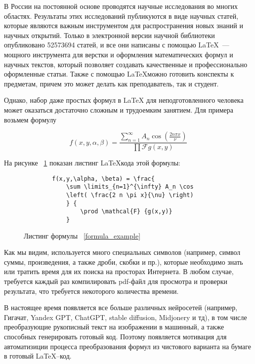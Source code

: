 \introduction %

В России на постоянной основе проводятся научные исследования во многих областях. Результаты этих исследований публикуются в виде научных статей, которые являются важным инструментом для распространения новых знаний и научных открытий.
Только в электронной версии научной библиотеки опубликовано 52573694 \cite{eLib} статей, и все они написаны с помощью \LaTeX ~--- мощного инструмента для верстки и оформления математических формул и научных текстов, который позволяет создавать качественные и профессионально оформленные статьи. 
Также с помощью \LaTeX \quad можно готовить конспекты к предметам, причем это может делать как преподаватель, так и студент.

Однако, набор даже простых формул в LaTeX для неподготовленного человека может оказаться достаточно сложным и трудоемким занятием.
Для примера возьмем формулу

\begin{equation}
    \label{formula_example}
        f(x,y,\alpha, \beta) = \frac{\sum \limits_{n=1}^{\infty} 
        A_n \cos \left( \frac{2 n \pi x}{\nu} \right)} {\prod \mathcal{F} {g(x,y)} } 
\end{equation}

На рисунке ~\ref{formula_listing} показан листинг \LaTeX \quad кода этой формулы:

\begin{figure}
    \begin{lstlisting}
        f(x,y,\alpha, \beta) = \frac{
            \sum \limits_{n=1}^{\infty} A_n \cos 
            \left( \frac{2 n \pi x}{\nu} \right)
            } {
                \prod \mathcal{F} {g(x,y)} 
            } 
    \end{lstlisting}
    \caption{Листинг формулы ~\ref{formula_example}}
    \label{formula_listing}
\end{figure}

Как мы видим, используется много специальных символов (например, символ суммы, произведения, а также дроби, скобки и пр.), которые необходимо знать или тратить время для их поиска на просторах Интернета. 
В любом случае, требуется каждый раз компилировать pdf-файл для просмотра и проверки результата, что требуется некоторого количества времени.

В настоящее время появляется все больше различных нейросетей (например, Гигачат, Yandex GPT, ChatGPT, stable diffusion, Midjonery и тд), в том числе преобразующие рукописный текст на изображении в машинный, а также способных генерировать готовый код. 
Поэтому появляется мотивация для автоматизиции процесса преобразования формул из чистового варианта на бумаге в готовый  \LaTeX --код.

